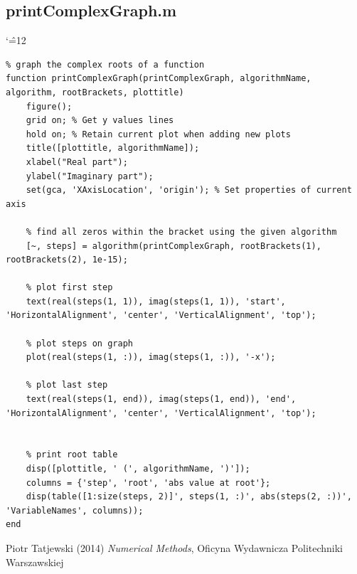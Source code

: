 \documentclass[12pt]{report}
\newenvironment{simplechar}{%
   \catcode`\^=12
}{}
\begin{document}
\subsection{printComplexGraph.m}
\begin{simplechar}
\begin{lstlisting}
% graph the complex roots of a function
function printComplexGraph(printComplexGraph, algorithmName, algorithm, rootBrackets, plottitle)
    figure();
    grid on; % Get y values lines
    hold on; % Retain current plot when adding new plots
    title([plottitle, algorithmName]);
    xlabel("Real part");
    ylabel("Imaginary part");
    set(gca, 'XAxisLocation', 'origin'); % Set properties of current axis

    % find all zeros within the bracket using the given algorithm
    [~, steps] = algorithm(printComplexGraph, rootBrackets(1), rootBrackets(2), 1e-15);

    % plot first step
    text(real(steps(1, 1)), imag(steps(1, 1)), 'start', 'HorizontalAlignment', 'center', 'VerticalAlignment', 'top');

    % plot steps on graph
    plot(real(steps(1, :)), imag(steps(1, :)), '-x');

    % plot last step
    text(real(steps(1, end)), imag(steps(1, end)), 'end', 'HorizontalAlignment', 'center', 'VerticalAlignment', 'top');


    % print root table
    disp([plottitle, ' (', algorithmName, ')']);
    columns = {'step', 'root', 'abs value at root'};
    disp(table([1:size(steps, 2)]', steps(1, :)', abs(steps(2, :))', 'VariableNames', columns));
end
\end{lstlisting}
\end{simplechar}


\begin{thebibliography}{9}
Piotr Tatjewski (2014) \emph{Numerical Methods}, Oficyna Wydawnicza Politechniki Warszawskiej
\end{thebibliography}
\end{document}
